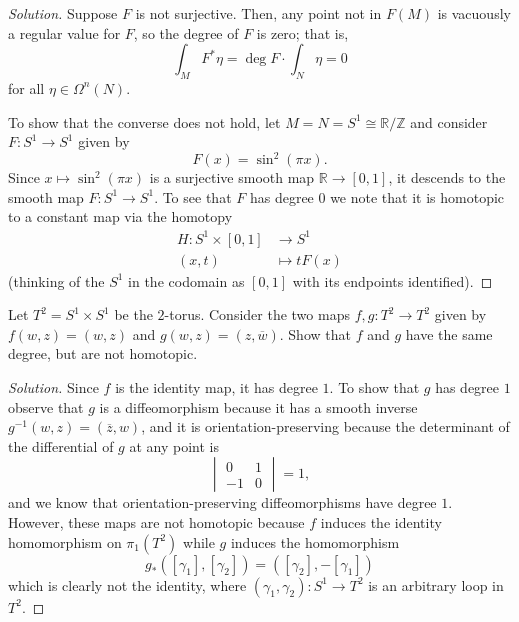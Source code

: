 \documentclass[10pt]{article}
\providecommand{\ol}{\overline}
\providecommand{\RR}{\mathbb R}
\providecommand{\ZZ}{\mathbb Z}
\providecommand{\inv}{^{-1}}
\newenvironment{soln}{\begin{proof}[Solution]}{\end{proof}}
\begin{document}
\begin{soln}
    Suppose $F$ is not surjective.
    Then, any point not in $F(M)$ is vacuously a regular value for $F$,
    so the degree of $F$ is zero; that is,
    \begin{equation*}
        \int_M F^*\eta = \deg F \cdot \int_N \eta = 0
    \end{equation*}
    for all $\eta\in\Omega^n(N)$.

    To show that the converse does not hold,
    let $M = N = S^1\cong \RR/\ZZ$ and consider
    $F\colon S^1\to S^1$ given by
    \begin{equation*}
	F(x) = \sin^2(\pi x).
    \end{equation*}
    Since $x\mapsto\sin^2(\pi x)$ is a surjective smooth map $\RR\to[0,1]$,
    it descends to the smooth map $F\colon S^1\to S^1$.
    To see that $F$ has degree $0$ we note that it is homotopic to
    a constant map via the homotopy
    \begin{align*}
	H\colon S^1\times[0,1]&\to S^1\\
	(x,t)&\mapsto tF(x)
    \end{align*}
    (thinking of the $S^1$ in the codomain as $[0,1]$
    with its endpoints identified).
\end{soln}

\pagebreak

\begin{problem}
    [17-13]
    Let $T^2 = S^1\times S^1$ be the $2$-torus.
    Consider the two maps $f,g\colon T^2\to T^2$ given by
    $f(w,z) = (w,z)$ and $g(w,z) = (z,\ol w)$.
    Show that $f$ and $g$ have the same degree, but are not homotopic.
\end{problem}

\begin{soln}
    Since $f$ is the identity map, it has degree $1$.
    To show that $g$ has degree $1$ observe that
    $g$ is a diffeomorphism because it has a smooth inverse
    $g\inv(w,z) = (\ol z,w)$, and it is orientation-preserving because
    the determinant of the differential of $g$ at any point is
    \begin{equation*}
        \begin{vmatrix}
	    0&1\\-1&0
        \end{vmatrix} = 1,
    \end{equation*}
    and we know that orientation-preserving diffeomorphisms
    have degree $1$.
    However, these maps are not homotopic because
    $f$ induces the identity homomorphism on $\pi_1(T^2)$
    while $g$ induces the homomorphism
    \begin{equation*}
	g_*([\gamma_1],[\gamma_2])
	= ([\gamma_2], -[\gamma_1])
    \end{equation*}
    which is clearly not the identity,
    where $(\gamma_1,\gamma_2)\colon S^1\to T^2$
    is an arbitrary loop in $T^2$.
\end{soln}
\end{document}
